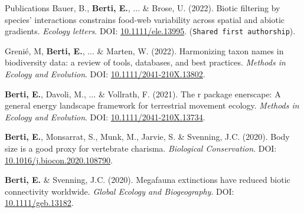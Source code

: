 \documentclass{resume} %
\begin{document}



\begin{rSection}{Publications}
Bauer, B., \textbf{Berti, E.}, ... \& Brose, U. (2022). Biotic filtering by species’ interactions constrains food-web variability across spatial and abiotic gradients. \textit{Ecology letters}. DOI: \href{https://doi.org/10.1111/ele.13995}{10.1111/ele.13995}. (\texttt{Shared first authorship}).

Grenié, M, \textbf{Berti, E.}, ... \& Marten, W. (2022). Harmonizing taxon names in biodiversity data: a review of tools, databases, and best practices. \textit{Methods in Ecology and Evolution}. DOI: \href{https://doi.org/10.1111/2041-210X.13802}{10.1111/2041-210X.13802}.

\textbf{Berti, E.}, Davoli, M., ... \& Vollrath, F. (2021). The r package enerscape: A general energy landscape framework for terrestrial movement ecology. \textit{Methods in Ecology and Evolution}. DOI: \href{https://doi.org/10.1111/2041-210X.13734}{10.1111/2041-210X.13734}.

\textbf{Berti, E.}, Monsarrat, S., Munk, M., Jarvie, S. \& Svenning, J.C. (2020). Body size is a good proxy for vertebrate charisma. \textit{Biological Conservation}. DOI: \href{https://doi.org/10.1016/j.biocon.2020.108790}{10.1016/j.biocon.2020.108790}.

\textbf{Berti, E.} \& Svenning, J.C. (2020). Megafauna extinctions have reduced biotic connectivity worldwide. \textit{Global Ecology and Biogeography}. DOI: \href{https://doi.org/10.1111/geb.13182}{10.1111/geb.13182}.
\end{rSection}
\end{document}
